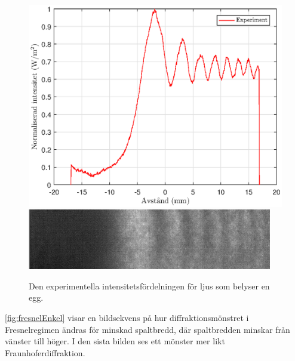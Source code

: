 \documentclass[a4paper]{article}
\begin{document}
\begin{figure}[h!]
	\centering
	\includegraphics[width=0.75\linewidth]{Data/Figurer/edge.eps}
	\includegraphics[width=0.5\linewidth]{Data/Figurer/edge.png}
	\caption{Den experimentella intensitetsfördelningen för ljus som belyser en egg.}
	\label{fig:edge}
\end{figure}

\FloatBarrier

\autoref{fig:fresnelEnkel} visar en bildsekvens på hur diffraktionsmönstret i Fresnelregimen ändras för minskad spaltbredd, där spaltbredden minskar från vänster till höger. I den sista bilden ses ett mönster mer likt Fraunhoferdiffraktion.

\FloatBarrier
\end{document}
